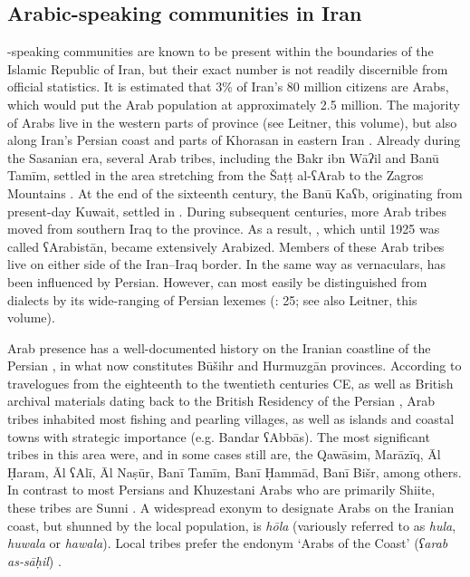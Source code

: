 \documentclass[output=paper]{langsci/langscibook}
\begin{document}
\subsection{Arabic-speaking communities in Iran}
-speaking communities are known to be present within the boundaries of the Islamic Republic of Iran, but their exact number is not readily discernible from official statistics. It is estimated that 3\% of Iran’s 80 million citizens are Arabs, which would put the Arab population at approximately 2.5 million. The majority of Arabs live in the western parts of  province (see Leitner, this volume), but also along Iran’s Persian  coast and parts of Khorasan in eastern Iran \citep{Oberling2011}. Already during the Sasanian era, several Arab tribes, including the Bakr ibn Wāʔil and Banū Tamīm, settled in the area stretching from the Šaṭṭ al-ʕArab to the Zagros Mountains \citep{Daniel2011}. At the end of the sixteenth century, the Banū Kaʕb, originating from present-day Kuwait, settled in . During subsequent centuries, more Arab tribes moved from southern Iraq to the province. As a result, , which until 1925 was called ʕArabistān, became extensively Arabized. Members of these Arab tribes live on either side of the Iran–Iraq border. In the same way as   vernaculars,   has been influenced by Persian. However,   can most easily be distinguished from  dialects by its wide-ranging  of Persian lexemes (\citealt{Ingham1997}: 25; see also Leitner, this volume).

Arab presence has a well-documented history on the Iranian coastline of the Persian , in what now constitutes Būšihr and Hurmuzgān provinces. According to travelogues from the eighteenth to the twentieth centuries CE, as well as British archival materials dating back to the British Residency of the Persian , Arab tribes inhabited most fishing and pearling villages, as well as islands and coastal towns with strategic importance (e.g. Bandar ʕAbbās). The most significant tribes in this area were, and in some cases still are, the Qawāsim, Marāzīq, Āl Ḥaram, Āl ʕAlī, Āl Naṣūr, Banī Tamīm, Banī Ḥammād, Banī Bišr, among others. In contrast to most Persians and Khuzestani Arabs who are primarily Shiite, these tribes are Sunni . A widespread exonym to designate Arabs on the Iranian coast, but shunned by the local population, is \textit{hōla} (variously referred to as \textit{hula}, \textit{huwala} or \textit{hawala}). Local tribes prefer the endonym ‘Arabs of the Coast’ (\textit{ʕarab} \textit{as-sāḥil}) \citep[110]{Gazsi2017}.
\end{document}
